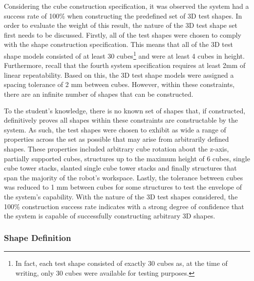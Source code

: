 
Considering the cube construction specification, it was observed the system had a success rate of 100\% when constructing the predefined set of 3D test shapes. In order to evaluate the weight of this result, the nature of the 3D test shape set first needs to be discussed. Firstly, all of the test shapes were chosen to comply with the shape construction specification. This means that all of the 3D test shape models consisted of at least 30 cubes\footnote{In fact, each test shape consisted of exactly 30 cubes as, at the time of writing, only 30 cubes were available for testing purposes.} and were at least 4 cubes in height. Furthermore, recall that the fourth system specification requires at least 2mm of linear repeatability. Based on this, the 3D test shape models were assigned a spacing tolerance of 2 mm between cubes. However, within these constraints, there are an infinite number of shapes that can be constructed. 

To the student's knowledge, there is no known set of shapes that, if constructed, definitively proves all shapes within these constraints are constructable by the system. As such, the test shapes were chosen to exhibit as wide a range of properties across the set as possible that may arise from arbitrarily defined shapes. These properties included arbitrary cube rotation about the z-axis, partially supported cubes, structures up to the maximum height of 6 cubes, single cube tower stacks, slanted single cube tower stacks and finally structures that span the majority of the robot's workspace. Lastly, the tolerance between cubes was reduced to 1 mm between cubes for some structures to test the envelope of the system's capability. With the nature of the 3D test shapes considered, the 100\% construction success rate indicates with a strong degree of confidence that the system is capable of successfully constructing arbitrary 3D shapes.

\subsubsection{Shape Definition}

